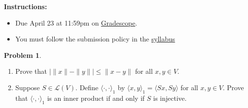 \documentclass[12pt]{article}
\theoremstyle{definition}
\newtheorem{problem}{Problem}
\begin{document}
\textbf{\Large{}}
    
\vspace{-1.8em}
\hrulefill

\textbf{Instructions:}
    \begin{itemize}
        \item Due April 23 at 11:59pm on \href{https://www.gradescope.com/courses/709136}{Gradescope}.
        \item You must follow the submission policy in the \href{https://courses.chen.pw/la_s2024/syllabus.html}{syllabus} 
\end{itemize}
   
\vspace{.5em}

\begin{problem}~
    \begin{enumerate}
        \item Prove that $| \|x\| - \|y\| | \leq \|x-y\|$ for all $x,y \in V$.
        \item Suppose $S\in\mathcal{L}(V)$. Define $\langle \cdot ,\cdot \rangle_1$ by $\langle x,y \rangle_1 = \langle Sx,Sy \rangle$ for all $x,y\in V$. Prove that $\langle \cdot ,\cdot \rangle_1$ is an inner product if and only if $S$ is injective.
    \end{enumerate}
\end{problem}
\end{document}

